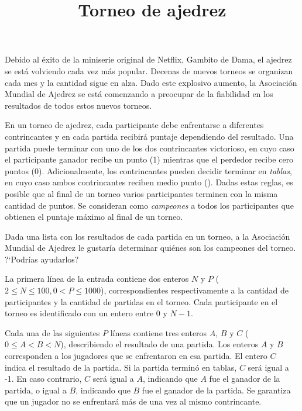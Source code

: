 \documentclass{oci}
\title{Torneo de ajedrez}
\begin{document}
\begin{problemDescription}
  Debido al éxito de la miniserie original de Netflix, Gambito de Dama, el ajedrez
  se está volviendo cada vez más popular.
  Decenas de nuevos torneos se organizan cada mes y la cantidad sigue en alza.
  Dado este explosivo aumento, la Asociación Mundial de Ajedrez se está comenzando a preocupar
  de la fiabilidad en los resultados de todos estos nuevos torneos.

  En un torneo de ajedrez, cada participante debe enfrentarse a diferentes contrincantes y en cada
  partida recibirá puntaje dependiendo del resultado.
  Una partida puede terminar con uno de los dos contrincantes victorioso, en cuyo caso el
  participante ganador recibe un punto (1) mientras que el perdedor recibe cero puntos (0).
  Adicionalmente, los contrincantes pueden decidir terminar en \emph{tablas}, en cuyo caso ambos
  contrincantes reciben medio punto ().
  Dadas estas reglas, es posible que al final de un torneo varios participantes terminen con
  la misma cantidad de puntos.
  Se consideran como \emph{campeones} a todos los participantes que obtienen el puntaje máximo
  al final de un torneo.

  Dada una lista con los resultados de cada partida en un torneo, a la Asociación
  Mundial de Ajedrez le gustaría determinar quiénes son los campeones del torneo.
  ?`Podrías ayudarlos?
\end{problemDescription}

\begin{inputDescription}
  La primera línea de la entrada contiene dos enteros $N$ y $P$
  ($2 \leq N \leq 100, 0 < P \leq 1000$),
  correspondientes respectivamente a la cantidad de participantes y la cantidad de partidas
  en el torneo.
  Cada participante en el torneo es identificado con un entero entre 0 y $N-1$.

  Cada una de las siguientes $P$ líneas contiene tres enteros $A$, $B$ y $C$
  ($0\leq A < B < N$), describiendo el resultado de una partida.
  Los enteros $A$ y $B$ corresponden a los jugadores que se enfrentaron en esa partida.
  El entero $C$ indica el resultado de la partida.
  Si la partida terminó en tablas, $C$ será igual a {-1}.
  En caso contrario, $C$ será igual a $A$, indicando que $A$ fue el ganador de la partida, o igual
  a $B$, indicando que $B$ fue el ganador de la partida.
  Se garantiza que un jugador no se enfrentará más de una vez al mismo contrincante.
\end{inputDescription}
\end{document}
